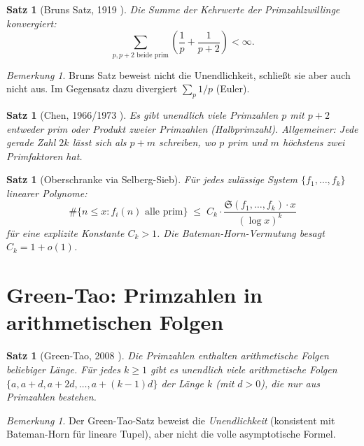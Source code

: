 \documentclass[12pt,a4paper]{amsart}
\newtheorem{satz}[theorem]{Satz}
\theoremstyle{definition}
\theoremstyle{remark}
\newtheorem{bemerkung}[theorem]{Bemerkung}
\newcommand{\BH}{\mathfrak{S}}
\begin{document}
\begin{satz}[Bruns Satz, 1919 \cite{Brun1919}]
  Die Summe der Kehrwerte der Primzahlzwillinge konvergiert:
  \[
    \sum_{p,p+2 \text{ beide prim}} \left(\frac{1}{p} + \frac{1}{p+2}\right) < \infty.
  \]
\end{satz}

\begin{bemerkung}
  Bruns Satz beweist nicht die Unendlichkeit, schließt sie aber auch nicht aus.
  Im Gegensatz dazu divergiert $\sum_p 1/p$ (Euler).
\end{bemerkung}

\begin{satz}[Chen, 1966/1973 \cite{Chen1973}]
  Es gibt unendlich viele Primzahlen $p$ mit $p+2$ entweder prim oder Produkt zweier
  Primzahlen (\emph{Halbprimzahl}).
  Allgemeiner: Jede gerade Zahl $2k$ lässt sich als $p + m$ schreiben, wo $p$ prim und
  $m$ höchstens zwei Primfaktoren hat.
\end{satz}

\begin{satz}[Oberschranke via Selberg-Sieb]
  Für jedes zulässige System $\{f_1,\ldots,f_k\}$ linearer Polynome:
  \[
    \#\{n \leq x : f_i(n) \text{ alle prim}\} \;\leq\;
    C_k \cdot \frac{\BH(f_1,\ldots,f_k) \cdot x}{(\log x)^k}
  \]
  für eine explizite Konstante $C_k > 1$.
  Die Bateman-Horn-Vermutung besagt $C_k = 1 + o(1)$.
\end{satz}

\section{Green-Tao: Primzahlen in arithmetischen Folgen}\label{sec:green_tao}

\begin{satz}[Green-Tao, 2008 \cite{GT2008}]\label{satz:green_tao}
  Die Primzahlen enthalten arithmetische Folgen beliebiger Länge.
  Für jedes $k \geq 1$ gibt es unendlich viele arithmetische Folgen
  $\{a, a+d, a+2d, \ldots, a+(k-1)d\}$ der Länge $k$ (mit $d > 0$), die nur aus
  Primzahlen bestehen.
\end{satz}

\begin{bemerkung}
  Der Green-Tao-Satz beweist die \emph{Unendlichkeit} (konsistent mit Bateman-Horn
  für lineare Tupel), aber nicht die volle asymptotische Formel.
\end{bemerkung}
\end{document}
